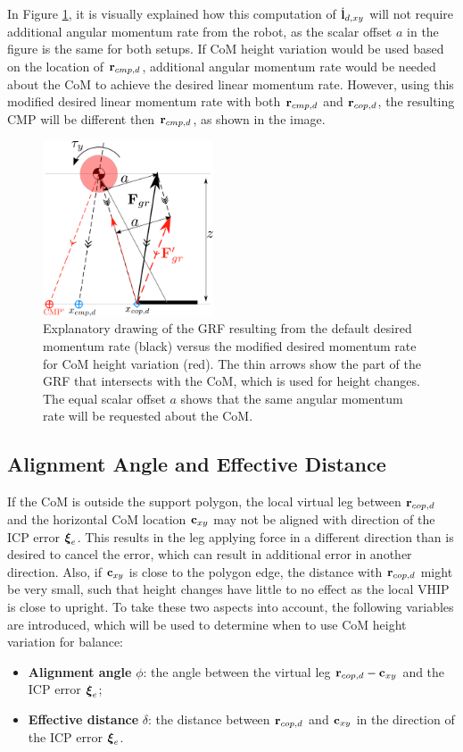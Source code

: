 In Figure \ref{fig:rcopdvsrcmpd}, it is visually explained how this computation of $\dot{\mathbf{l}}_{d,xy}$ will not require additional angular momentum rate from the robot, as the scalar offset $a$ in the figure is the same for both setups. If \ac{CoM} height variation would be used based on the location of $\mathbf{r}_{cmp,d}$, additional angular momentum rate would be needed about the \ac{CoM} to achieve the desired linear momentum rate. However, using this modified desired linear momentum rate with both $\mathbf{r}_{cmp,d}$ and $\mathbf{r}_{cop,d}$, the resulting \ac{CMP} will be different then $\mathbf{r}_{cmp,d}$, as shown in the image. 

\begin{figure}
\centering
\includegraphics[width=0.45\textwidth]{STYLESTUFF/2DControlStrategyViz.png}
\caption{Explanatory drawing of the \ac{GRF} resulting from the default desired momentum rate (black) versus the modified desired momentum rate for \ac{CoM} height variation (red). The thin arrows show the part of the \ac{GRF} that intersects with the \ac{CoM}, which is used for height changes. The equal scalar offset $a$ shows that the same angular momentum rate will be requested about the \ac{CoM}.}
\label{fig:rcopdvsrcmpd}
\end{figure}
\subsection{Alignment Angle and Effective Distance}
If the \ac{CoM} is outside the support polygon, the local virtual leg between $\mathbf{r}_{cop,d}$ and the horizontal \ac{CoM} location $\mathbf{c}_{xy}$ may not be aligned with direction of the \ac{ICP} error $\boldsymbol{\xi}_e$. This results in the leg applying force in a different direction than is desired to cancel the error, which can result in additional error in another direction. Also, if $\mathbf{c}_{xy}$ is close to the polygon edge, the distance with $\mathbf{r}_{cop,d}$ might be very small, such that height changes have little to no effect as the local \ac{VHIP} is close to upright. To take these two aspects into account, the following variables are introduced, which will be used to determine when to use \ac{CoM} height variation for balance:
\begin{itemize}
	\item \textbf{Alignment angle} $\phi$: the angle between the virtual leg $\mathbf{r}_{cop,d}-\mathbf{c}_{xy}$ and the \ac{ICP} error $\boldsymbol{\xi}_e$;
	\item \textbf{Effective distance} $\delta$: the distance between $\mathbf{r}_{cop,d}$ and $\mathbf{c}_{xy}$ in the direction of the \ac{ICP} error $\boldsymbol{\xi}_e$.
\end{itemize}

